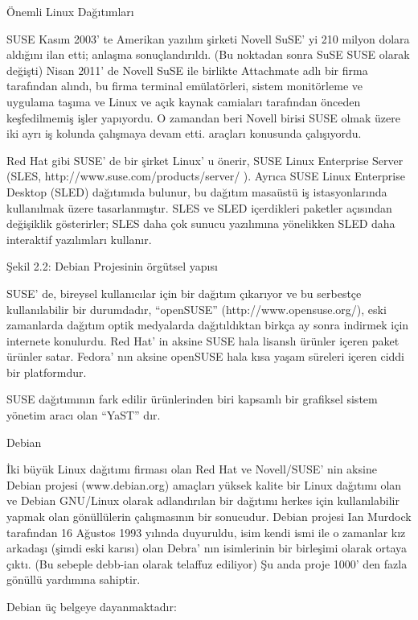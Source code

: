 \documentclass[10pt,a5paper]{book}
\begin{document}
\begin{section}{Önemli Linux Dağıtımları}
\begin{subsection}{SUSE}
Kasım 2003' te Amerikan yazılım şirketi Novell SuSE' yi 210 milyon dolara aldığını ilan etti; anlaşma sonuçlandırıldı. (Bu noktadan sonra SuSE SUSE olarak değişti) Nisan 2011' de Novell SuSE ile birlikte Attachmate adlı bir firma tarafından alındı, bu firma terminal emülatörleri, sistem monitörleme ve uygulama taşıma ve Linux ve açık kaynak camiaları tarafından önceden keşfedilmemiş işler yapıyordu. O zamandan beri Novell birisi SUSE olmak üzere iki ayrı iş kolunda çalışmaya devam etti. araçları konusunda çalışıyordu.

Red Hat gibi SUSE' de bir şirket Linux' u önerir, SUSE Linux Enterprise Server (SLES, http://www.suse.com/products/server/ ). Ayrıca SUSE Linux Enterprise Desktop (SLED) dağıtımıda bulunur, bu dağıtım masaüstü iş istasyonlarında kullanılmak üzere tasarlanmıştır. SLES ve SLED içerdikleri paketler açısından değişiklik gösterirler; SLES daha çok sunucu yazılımına yönelikken SLED daha interaktif yazılımları kullanır.

Şekil 2.2: Debian Projesinin örgütsel yapısı

SUSE' de, bireysel kullanıcılar için bir dağıtım çıkarıyor ve bu serbestçe kullanılabilir bir durumdadır, “openSUSE” (http://www.opensuse.org/), eski zamanlarda dağıtım optik medyalarda dağıtıldıktan birkça ay sonra indirmek için internete konulurdu. Red Hat' in aksine SUSE hala lisanslı ürünler içeren paket ürünler satar. Fedora' nın aksine openSUSE hala kısa yaşam süreleri içeren ciddi bir platformdur.

SUSE dağıtımının fark edilir ürünlerinden biri kapsamlı bir grafiksel sistem yönetim aracı olan “YaST” dır.

\end{subsection}
\begin{subsection}{Debian}

İki büyük Linux dağıtımı firması olan Red Hat ve Novell/SUSE' nin aksine Debian projesi (www.debian.org) amaçları yüksek kalite bir Linux dağıtımı olan ve Debian GNU/Linux olarak adlandırılan bir dağıtımı herkes için kullanılabilir yapmak olan gönüllülerin çalışmasının bir sonucudur. Debian projesi Ian Murdock tarafından 16 Ağustos 1993 yılında duyuruldu, isim kendi ismi ile o zamanlar kız arkadaşı (şimdi eski karısı) olan Debra' nın isimlerinin bir birleşimi olarak ortaya çıktı. (Bu sebeple debb-ian olarak telaffuz ediliyor) Şu anda proje 1000' den fazla gönüllü yardımına sahiptir.

Debian üç belgeye dayanmaktadır:


\end{subsection}
\end{section}
\end{document}
